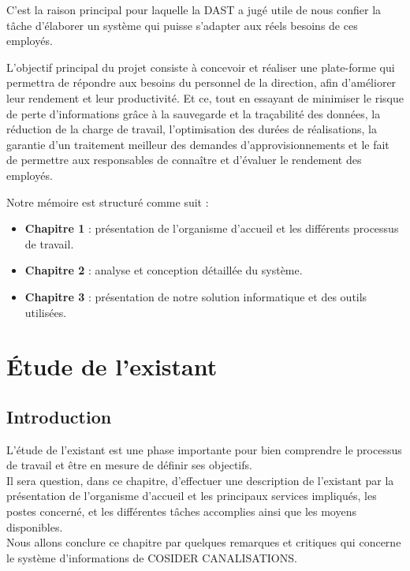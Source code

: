 \documentclass{report}
\begin{document}
C’est la raison principal pour laquelle la DAST a jugé utile de nous confier la tâche d’élaborer un système qui puisse s’adapter aux réels besoins de ces employés.

L’objectif principal du projet consiste à concevoir et réaliser une plate-forme qui permettra de répondre aux besoins du personnel de la direction, afin d’améliorer leur rendement et leur productivité. Et ce, tout en essayant de minimiser le risque de perte d'informations grâce à la sauvegarde et la traçabilité des données, la réduction de la charge de travail, l'optimisation des durées de réalisations, la garantie d'un traitement meilleur des demandes d’approvisionnements et le fait de permettre aux responsables de connaître et d’évaluer le rendement des employés.

Notre mémoire est structuré comme suit :
\begin{itemize}
    \item \textbf{Chapitre 1} : présentation de l'organisme d’accueil et les différents processus de travail.
    \item \textbf{Chapitre 2} : analyse et conception détaillée du système.
    \item \textbf{Chapitre 3} : présentation de notre solution informatique et des outils utilisées. 
\end{itemize}


\chapter{Étude de l'existant}
\newpage 
\section{Introduction}
L’étude de l’existant est une phase importante pour bien comprendre le processus de travail et être en mesure de définir ses objectifs.\\Il sera question, dans ce chapitre, d’effectuer une description de l’existant par la présentation de l’organisme d’accueil et les principaux services impliqués, les postes concerné, et les différentes tâches accomplies ainsi que les moyens disponibles.\\ 
Nous allons conclure ce chapitre par quelques remarques et critiques qui concerne le système d’informations de COSIDER CANALISATIONS.
\end{document}
